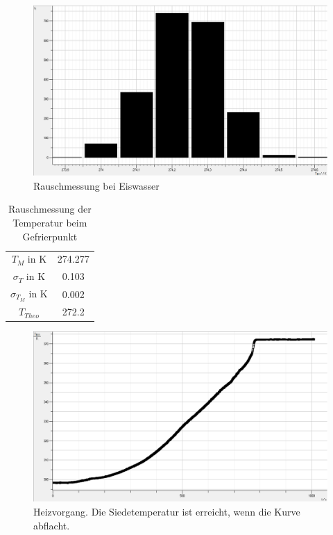 \documentclass[12pt,a4paper]{article}
\begin{document}
\begin{figure}[hbtp]
\centering
\includegraphics[scale=0.5]{Bilder/Kalibration_Eiswasser.png}
\caption{Rauschmessung bei Eiswasser}
\end{figure}

\begin{table}[H]\centering
\caption{Rauschmessung der Temperatur beim Gefrierpunkt}
\begin{tabular}{c|c}
$T_M$ in K & 274.277  \\ 
$\sigma_T$ in K & 0.103  \\  
$\sigma_{T_M}$ in K & 0.002 \\  
$T_{Theo}$ & 272.2 \\
\end{tabular} 
\end{table}

\begin{figure}[H]
\centering
\includegraphics[scale=0.5]{Bilder/heizen.png}
\caption{Heizvorgang. Die Siedetemperatur ist erreicht, wenn die Kurve abflacht.}
\end{figure}
\end{document}
